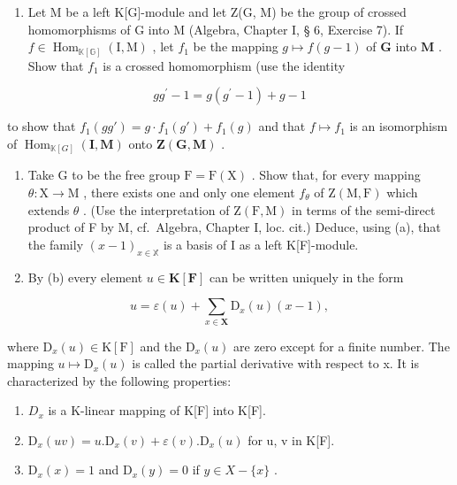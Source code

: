 \begin{enumerate}
\def\labelenumi{(\alph{enumi})}
\tightlist
\item
  Let M be a left K{[}G{]}-module and let Z(G, M) be the group of crossed homomorphisms of G into M (Algebra, Chapter I, § 6, Exercise 7). If \(f \in \operatorname{Hom}_{\mathbb{K}[\mathbb{G}]}(\mathrm{I}, \mathrm{M})\) , let \(f_1\) be the mapping \(g \mapsto f(g - 1)\) of \(\mathbf{G}\) into \(\mathbf{M}\) . Show that \(f_1\) is a crossed homomorphism (use the identity
\end{enumerate}

\[
g g ^ {\prime} - 1 = g (g ^ {\prime} - 1) + g - 1
\]

to show that \(f_{1}(gg') = g \cdot f_{1}(g') + f_{1}(g)\) and that \(f \mapsto f_{1}\) is an isomorphism of \(\operatorname{Hom}_{\mathbb{K}[G]}(\mathbf{I}, \mathbf{M})\) onto \(\mathbf{Z}(\mathbf{G}, \mathbf{M})\) .

\begin{enumerate}
\def\labelenumi{(\alph{enumi})}
\setcounter{enumi}{1}
\item
  Take G to be the free group \(\mathrm{F} = \mathrm{F}(\mathrm{X})\) . Show that, for every mapping \(\theta: \mathrm{X} \to \mathrm{M}\) , there exists one and only one element \(f_{\theta}\) of \(\mathrm{Z}(\mathrm{M}, \mathrm{F})\) which extends \(\theta\) . (Use the interpretation of \(\mathrm{Z}(\mathrm{F}, \mathrm{M})\) in terms of the semi-direct product of F by M, cf.~Algebra, Chapter I, loc. cit.) Deduce, using (a), that the family \((x - 1)_{x \in \mathbb{X}}\) is a basis of I as a left K{[}F{]}-module.
\item
  By (b) every element \(u \in \mathbf{K}[\mathbf{F}]\) can be written uniquely in the form
\end{enumerate}

\[
u = \varepsilon (u) + \sum_ {x \in \mathbf {X}} \mathrm{D} _ {x} (u) (x - 1),
\]

where \(\mathrm{D}_{x}(u)\in\mathrm{K}[\mathrm{F}]\) and the \(\mathrm{D}_{x}(u)\) are zero except for a finite number. The mapping \(u\mapsto\mathrm{D}_{x}(u)\) is called the partial derivative with respect to x. It is characterized by the following properties:

\begin{enumerate}
\def\labelenumi{(\roman{enumi})}
\item
  \(D_{x}\) is a K-linear mapping of K{[}F{]} into K{[}F{]}.
\item
  \(\mathrm{D}_{x}(uv)=u.\mathrm{D}_{x}(v)+\varepsilon(v).\mathrm{D}_{x}(u)\) for u, v in K{[}F{]}.
\item
  \(\mathrm{D}_{x}(x)=1\) and \(\mathrm{D}_{x}(y)=0\) if \(y\in X-\{x\}\) .
\end{enumerate}

